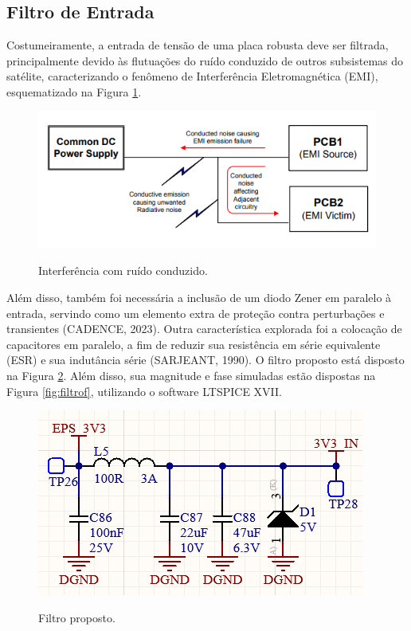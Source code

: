 \subsection{Filtro de Entrada}

Costumeiramente, a entrada de tensão de uma placa robusta deve ser filtrada, principalmente devido às flutuações do ruído conduzido de outros subsistemas do satélite, caracterizando o fenômeno de Interferência Eletromagnética (EMI), esquematizado na Figura \ref{fig:emi}.

\begin{figure}[H]
    \centering
    \caption{Interferência com ruído conduzido.}
    \includegraphics[scale=1]{images/EMI noise.png}
    \label{fig:emi}
\end{figure}

Além disso, também foi necessária a inclusão de um diodo Zener em paralelo à entrada, servindo como um elemento extra de proteção contra perturbações e transientes (CADENCE, 2023). Outra característica explorada foi a colocação de capacitores em paralelo, a fim de reduzir sua resistência em série equivalente (ESR) e sua indutância série (SARJEANT, 1990).  O filtro proposto está disposto na Figura \ref{fig:FILTRO}.  Além disso, sua magnitude e fase simuladas estão dispostas na Figura \ref{fig:filtrof}, utilizando o software LTSPICE XVII.

\begin{figure}[H]
    \centering
    \caption{Filtro proposto.}
    \includegraphics[scale=1]{images/FILTRO.png}
    \label{fig:FILTRO}
\end{figure}

